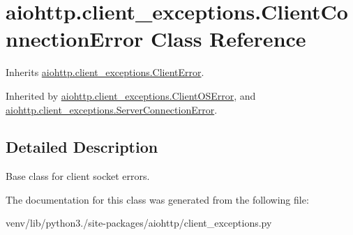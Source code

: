 \hypertarget{classaiohttp_1_1client__exceptions_1_1_client_connection_error}{}\section{aiohttp.\+client\+\_\+exceptions.\+Client\+Connection\+Error Class Reference}
\label{classaiohttp_1_1client__exceptions_1_1_client_connection_error}


Inherits \hyperlink{classaiohttp_1_1client__exceptions_1_1_client_error}{aiohttp.\+client\+\_\+exceptions.\+Client\+Error}.



Inherited by \hyperlink{classaiohttp_1_1client__exceptions_1_1_client_o_s_error}{aiohttp.\+client\+\_\+exceptions.\+Client\+O\+S\+Error}, and \hyperlink{classaiohttp_1_1client__exceptions_1_1_server_connection_error}{aiohttp.\+client\+\_\+exceptions.\+Server\+Connection\+Error}.



\subsection{Detailed Description}
\begin{DoxyVerb}Base class for client socket errors.\end{DoxyVerb}
 

The documentation for this class was generated from the following file\+:\begin{DoxyCompactItemize}
\item 
venv/lib/python3./site-\/packages/aiohttp/client\+\_\+exceptions.\+py\end{DoxyCompactItemize}
